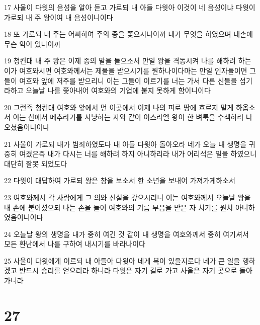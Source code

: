 \par 17 사울이 다윗의 음성을 알아 듣고 가로되 내 아들 다윗아 이것이 네 음성이냐 다윗이 가로되 내 주 왕이여 내 음성이니이다
\par 18 또 가로되 내 주는 어찌하여 주의 종을 쫓으시나이까 내가 무엇을 하였으며 내손에 무슨 악이 있나이까
\par 19 청컨대 내 주 왕은 이제 종의 말을 들으소서 만일 왕을 격동시켜 나를 해하려 하는 이가 여호와시면 여호와께서는 제물을 받으시기를 원하나이다마는 만일 인자들이면 그들이 여호와 앞에 저주를 받으리니 이는 그들이 이르기를 너는 가서 다른 신들을 섬기라하고 오늘날 나를 쫓아내어 여호와의 기업에 붙지 못하게 함이니이다
\par 20 그런즉 청컨대 여호와 앞에서 먼 이곳에서 이제 나의 피로 땅에 흐르지 말게 하옵소서 이는 산에서 메추라기를 사냥하는 자와 같이 이스라엘 왕이 한 벼룩을 수색하러 나오셨음이니이다
\par 21 사울이 가로되 내가 범죄하였도다 내 아들 다윗아 돌아오라 네가 오늘 내 생명을 귀중히 여겼은즉 내가 다시는 너를 해하려 하지 아니하리라 내가 어리석은 일을 하였으니 대단히 잘못 되었도다
\par 22 다윗이 대답하여 가로되 왕은 창을 보소서 한 소년을 보내어 가져가게하소서
\par 23 여호와께서 각 사람에게 그 의와 신실을 갚으시리니 이는 여호와께서 오늘날 왕을 내 손에 붙이셨으되 나는 손을 들어 여호와의 기름 부음을 받은 자 치기를 원치 아니하였음이니이다
\par 24 오늘날 왕의 생명을 내가 중히 여긴 것 같이 내 생명을 여호와께서 중히 여기셔서 모든 환난에서 나를 구하여 내시기를 바라나이다
\par 25 사울이 다윗에게 이르되 내 아들아 다윗아 네게 복이 있을지로다 네가 큰 일을 행하겠고 반드시 승리를 얻으리라 하니라 다윗은 자기 길로 가고 사울은 자기 곳으로 돌아가니라

\chapter{27}

